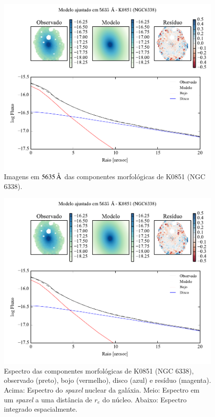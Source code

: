 \begin{figure}
	\includegraphics[page=3]{figuras-decomp/K0851_sample006a}
	\caption[Imagens em $5635\,\angstrom$ das componentes morfológicas de K0851
	(NGC 6338)]
	{Imagens em $5635\,\angstrom$ das componentes morfológicas de K0851
	(NGC 6338).}
	\label{fig:decompImages:K0851}
\end{figure}

\begin{figure}
	\includegraphics[page=4]{figuras-decomp/K0851_sample006a}
	\caption[Espectro das componentes morfológicas de K0851 (NGC 6338)]
	{Espectro das componentes morfológicas de K0851 (NGC 6338),
	observado (preto), bojo (vermelho), disco (azul) e resíduo (magenta). Acima:
	Espectro do {\em spaxel} nuclear da galáxia. Meio: Espectro em um {\em spaxel}
	a uma distância de $r_e$ do núcleo. Abaixo: Espectro integrado espacialmente.}
	\label{fig:decompSpectra:K0851}
\end{figure}

